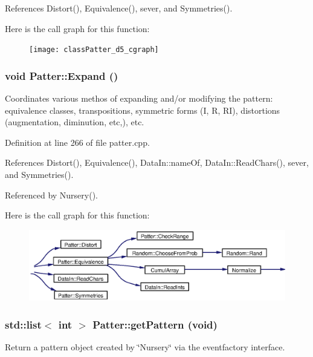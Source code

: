 References Distort(), Equivalence(), sever, and Symmetries().

Here is the call graph for this function:\begin{figure}[H]
\begin{center}
\leavevmode
\texttt{[image: classPatter\_d5\_cgraph]}
\end{center}
\end{figure}
\subsubsection{\setlength{\rightskip}{0pt plus 5cm}void Patter::Expand ()\hspace{0.3cm}{\tt  [private]}}\label{classPatter_d4}


Coordinates various methos of expanding and/or modifying the pattern: equivalence classes, transpositions, symmetric forms (I, R, RI), distortions (augmentation, diminution, etc,), etc. 

Definition at line 266 of file patter.cpp.

References Distort(), Equivalence(), Data\-In::name\-Of, Data\-In::Read\-Chars(), sever, and Symmetries().

Referenced by Nursery().

Here is the call graph for this function:\begin{figure}[H]
\begin{center}
\leavevmode
\includegraphics[width=318pt]{classPatter_d4_cgraph}
\end{center}
\end{figure}
\subsubsection{\setlength{\rightskip}{0pt plus 5cm}std::list$<$ int $>$ Patter::get\-Pattern (void)}\label{classPatter_a9}


Return a pattern object created by \char`\"{}Nursery\char`\"{} via the eventfactory interface. 

